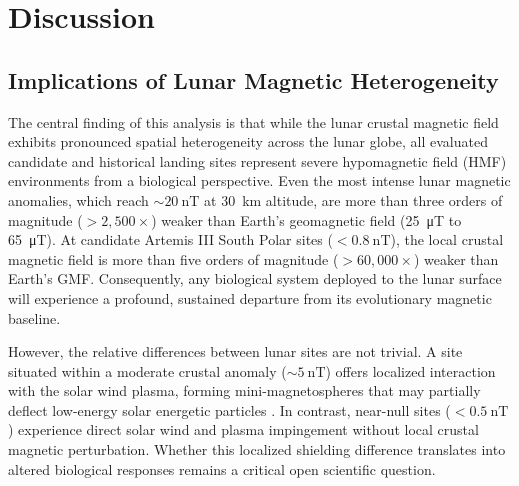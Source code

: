 \section{Discussion}
\label{sec:discussion}

\subsection{Implications of Lunar Magnetic Heterogeneity}
The central finding of this analysis is that while the lunar crustal magnetic field exhibits pronounced spatial heterogeneity across the lunar globe, all evaluated candidate and historical landing sites represent severe hypomagnetic field (HMF) environments from a biological perspective. Even the most intense lunar magnetic anomalies, which reach $\sim\SI{20}{\nano\tesla}$ at \SI{30}{\kilo\meter} altitude, are more than three orders of magnitude ($>2,500\times$) weaker than Earth's geomagnetic field (\SI{25}{\micro\tesla} to \SI{65}{\micro\tesla}). At candidate Artemis III South Polar sites ($< \SI{0.8}{\nano\tesla}$), the local crustal magnetic field is more than five orders of magnitude ($>60,000\times$) weaker than Earth's GMF. Consequently, any biological system deployed to the lunar surface will experience a profound, sustained departure from its evolutionary magnetic baseline.

However, the relative differences between lunar sites are not trivial. A site situated within a moderate crustal anomaly ($\sim\SI{5}{\nano\tesla}$) offers localized interaction with the solar wind plasma, forming mini-magnetospheres that may partially deflect low-energy solar energetic particles \citep{Mitchell2008}. In contrast, near-null sites ($< \SI{0.5}{\nano\tesla}$) experience direct solar wind and plasma impingement without local crustal magnetic perturbation. Whether this localized shielding difference translates into altered biological responses remains a critical open scientific question.

